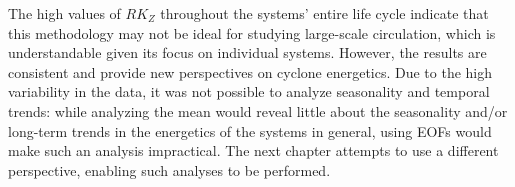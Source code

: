 The high values of $RK_Z$ throughout the systems' entire life cycle indicate that this methodology may not be ideal for studying large-scale circulation, which is understandable given its focus on individual systems. However, the results are consistent and provide new perspectives on cyclone energetics. Due to the high variability in the data, it was not possible to analyze seasonality and temporal trends: while analyzing the mean would reveal little about the seasonality and/or long-term trends in the energetics of the systems in general, using EOFs would make such an analysis impractical. The next chapter attempts to use a different perspective, enabling such analyses to be performed.


